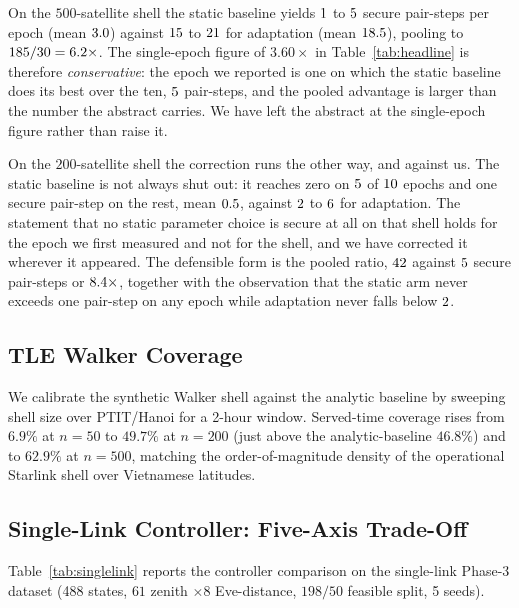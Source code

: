 On the $500$-satellite shell the static baseline yields $1$ to $5$
secure pair-steps per epoch (mean $3.0$) against $15$ to
$21$ for adaptation (mean $18.5$), pooling to
$185/30 = 6.2\times$. The single-epoch figure of
$3.60\times$ in Table~\ref{tab:headline} is therefore \emph{conservative}: the epoch we
reported is one on which the static baseline does its best over the ten, $5$
pair-steps, and the pooled advantage is larger than the number the abstract carries. We
have left the abstract at the single-epoch figure rather than raise it.

On the $200$-satellite shell the correction runs the other way, and against us. The static
baseline is not always shut out: it reaches zero on $5$ of
$10$ epochs and one secure pair-step on the rest, mean $0.5$,
against $2$ to $6$ for adaptation. The statement that no
static parameter choice is secure at all on that shell holds for the epoch we first
measured and not for the shell, and we have corrected it wherever it appeared. The
defensible form is the pooled ratio, $42$ against $5$ secure
pair-steps or $8.4\times$, together with the observation that the static arm
never exceeds one pair-step on any epoch while adaptation never falls below
$2$.

\subsection{TLE Walker Coverage}\label{sec:results:coverage}

We calibrate the synthetic Walker shell against the analytic baseline by sweeping shell size over PTIT/Hanoi for a 2-hour window. Served-time coverage rises from $6.9\%$ at $n{=}50$ to $49.7\%$ at $n{=}200$ (just above the analytic-baseline $46.8\%$) and to $62.9\%$ at $n{=}500$, matching the order-of-magnitude density of the operational Starlink shell over Vietnamese latitudes.

\subsection{Single-Link Controller: Five-Axis Trade-Off}\label{sec:results:singlelink}

Table~\ref{tab:singlelink} reports the controller comparison on the single-link Phase-3 dataset (488 states, $61$ zenith $\times 8$ Eve-distance, $198/50$ feasible split, 5 seeds).

